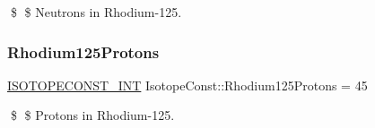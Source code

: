 \$ \$ Neutrons in Rhodium-\/125. \mbox{\label{group___isotope_const-_rhodium-_rh125_gae4122c818dcf99f92e24b50d677ce1fc}} 
\subsubsection{\texorpdfstring{Rhodium125\+Protons}{Rhodium125Protons}}
{\footnotesize\ttfamily \mbox{\hyperlink{group___isotope_const-_macros_ga5f18360b3e99483a35c32d789e62621c}{I\+S\+O\+T\+O\+P\+E\+C\+O\+N\+S\+T\+\_\+\+I\+NT}} Isotope\+Const\+::\+Rhodium125\+Protons = 45}

\$ \$ Protons in Rhodium-\/125. 